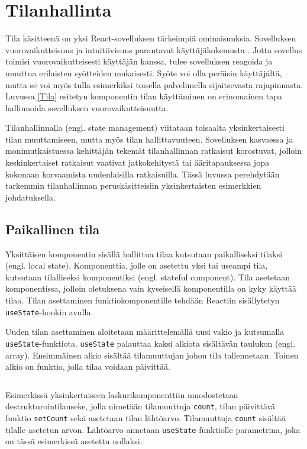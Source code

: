 \chapter{Tilanhallinta} \label{tilanhallinta}

Tila käsitteenä on yksi React-sovelluksen tärkeimpiä ominaisuuksia. Sovelluksen vuorovaikutteisuus ja intuitiivisuus parantavat käyttäjäkokemusta \cite{userexperience}. Jotta sovellus toimisi vuorovaikutteisesti käyttäjän kanssa, tulee sovelluksen reagoida ja muuttua erilaisten syötteiden mukaisesti. Syöte voi olla peräisin käyttäjältä, mutta se voi myös tulla esimerkiksi toisella palvelimella sijaitsevasta rajapinnasta. Luvussa \ref{Tila} esitetyn komponentin tilan käyttäminen on erinomainen tapa hallinnoida sovelluksen vuorovaikutteisuutta.

Tilanhallinnalla (engl. state management) viitataan toisaalta yksinkertaisesti tilan muuttamiseen, mutta myös tilan hallittavuuteen. Sovelluksen kasvaessa ja monimutkaistuessa kehittäjän tekemät tilanhallinnan ratkaisut korostuvat, jolloin keskinkertaiset ratkaisut vaativat jatkokehitystä tai ääritapauksessa jopa kokonaan korvaamista uudenlaisilla ratkaisuilla. Tässä luvussa perehdytään tarkemmin tilanhallinnan peruskäsitteisiin yksinkertaisten esimerkkien johdatuksella.


\section{Paikallinen tila}
\label{Paikallinen tila}

Yksittäisen komponentin sisällä hallittua tilaa kutsutaan paikalliseksi tilaksi (engl. local state). Komponenttia, jolle on asetettu yksi tai useampi tila, kutsutaan tilalliseksi komponentiksi (engl. stateful component). Tila asetetaan komponentissa, jolloin oletuksena vain kyseisellä komponentilla on kyky käyttää tilaa. Tilan asettaminen funktiokomponentille tehdään Reactiin sisällytetyn \texttt{useState}-hookin avulla.

Uuden tilan asettaminen aloitetaan määrittelemällä uusi vakio ja kutsumalla \texttt{useState}-funktiota. \texttt{useState} palauttaa kaksi alkiota sisältävän taulukon (engl. array). Ensimmäinen alkio sisältää tilamuuttujan johon tila tallennetaan. Toinen alkio on funktio, jolla tilaa voidaan päivittää. \cite[64]{reactandnative}
\inputminted[bgcolor=black,highlightlines={2},highlightcolor=darkgray]{jsx.py:JsxLexer -x}{listaukset/counter.js}
Esimerkissä yksinkertaiseen laskurikomponenttiin muodostetaan destrukturointilauseke, jolla nimetään tilamuuttuja \texttt{count}, tilan päivittävä funktio \texttt{setCount} sekä asetetaan tilan lähtöarvo. Tilamuuttuja \texttt{count} sisältää tilalle asetetun arvon. Lähtöarvo annetaan \texttt{useState}-funktiolle parametrina, joka on tässä esimerkissä asetettu nollaksi.



